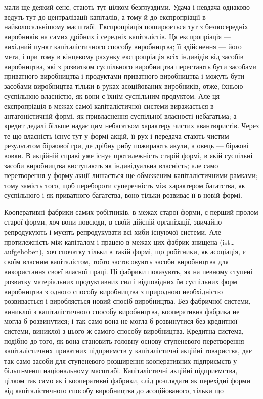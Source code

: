 \parcont{}  %
мали ще деякий сенс, стають тут цілком безглуздими. Удача
і невдача однаково ведуть тут до централізації капіталів,
а тому й до експропріації в найколосальнішому масштабі. Експропріація поширюється тут з
безпосередніх виробників на
самих дрібних і середніх капіталістів. Ця експропріація — вихідний пункт капіталістичного способу
виробництва; її здійснення — його мета, і при тому в кінцевому рахунку експропріація всіх індивідів
від засобів виробництва, які з розвитком
суспільного виробництва перестають бути засобами приватного
виробництва і продуктами приватного виробництва і можуть
бути засобами виробництва тільки в руках асоційованих виробників, отже, їхньою суспільною власністю,
як вони є їхнім суспільним
продуктом. Але ця експропріація в межах самої капіталістичної
системи виражається в антагоністичній формі, як привласнення
суспільної власності небагатьма; а кредит дедалі більше надає
цим небагатьом характеру чистих авантюристів. Через те що
власність існує тут у формі акцій, її рух і передача стають
чистим результатом біржової гри, де дрібну рибу пожирають
акули, а овець — біржові вовки. В акційній справі уже існує
протилежність старій формі, в якій суспільні засоби виробництва
виступають як індивідуальна власність; але само перетворення
у форму акції лишається ще обмеженим капіталістичними рамками; тому замість того, щоб перебороти
суперечність між
характером багатства, як суспільного і як приватного багатства, воно тільки розвиває її в новій
формі.

Кооперативні фабрики самих робітників, в межах старої
форми, є перший пролом старої форми, хоч вони повсюди,
в своїй дійсній організації, звичайно репродукують і мусять
репродукувати всі хиби існуючої системи. Але протилежність між
капіталом і працею в межах цих фабрик знищена (ist\dots{} aufgehoben),
хоч спочатку тільки в такій формі, що робітники, як асоціація,
є своїм власним капіталістом, тобто застосовують засоби виробництва для використання своєї власної
праці. Ці фабрики показують, як на певному ступені розвитку матеріальних продуктивних сил і
відповідних їм суспільних форм виробництва з одного
способу виробництва з природною необхідністю розвивається і
виробляється новий спосіб виробництва. Без фабричної системи,
виниклої з капіталістичного способу виробництва, кооперативна фабрика не могла б розвинутися; і так
само вона не могла б
розвинутися без кредитної системи, виниклої з цього ж самого
способу виробництва. Кредитна система, подібно до того, як
вона становить головну основу ступеневого перетворення капіталістичних приватних підприємств у
капіталістичні акційні товариства, дає так само засоби для ступеневого розширення кооперативних
підприємств у більш-менш національному масштабі.
Капіталістичні акційні підприємства, цілком так само як і кооперативні фабрики, слід розглядати як
перехідні форми від капіталістичного способу виробництва до асоційованого, тільки що
\parbreak{}  %
